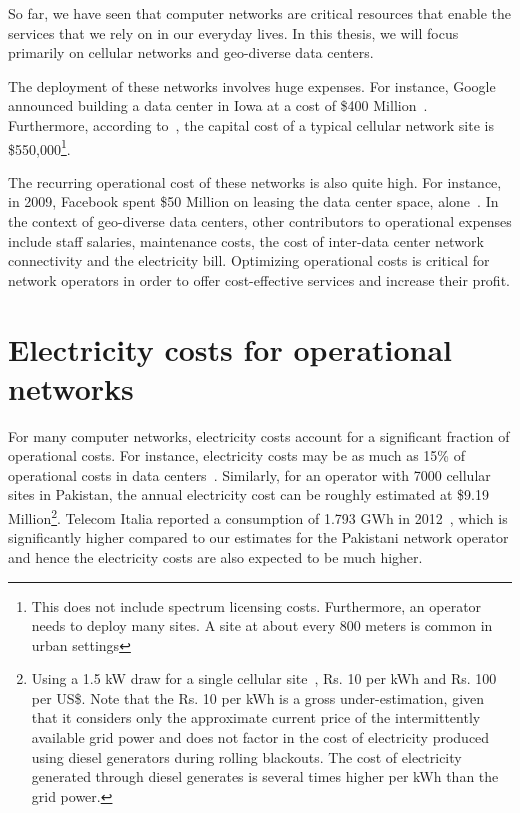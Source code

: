 So far, we have seen that computer networks are critical resources that enable the services that we rely on in our everyday lives. In this thesis, we will focus primarily on cellular networks and geo-diverse data centers. 

The deployment of these networks involves huge expenses. For instance, Google announced building a data center in Iowa at a cost of \$400 Million~\cite{CostOfADC}. Furthermore, according to~\cite{costcellsite}, the capital cost of a typical cellular network site is \$550,000\footnote{This does not include spectrum licensing costs. Furthermore, an operator needs to deploy many sites. A site at about every 800 meters is common in urban settings}. 

The recurring operational cost of these networks is also quite high. For instance, in 2009, Facebook spent \$50 Million on leasing the data center space, alone~\cite{FBLease}. In the context of geo-diverse data centers, other contributors to operational expenses include staff salaries, maintenance costs, the cost of inter-data center network connectivity and the electricity bill. Optimizing operational costs is critical for network operators in order to offer cost-effective services and increase their profit.

\section{Electricity costs for operational networks} 
For many computer networks, electricity costs account for a significant fraction of operational costs. For instance, electricity costs may be as much as 15\% of operational costs in data centers~\cite{costCloud}. Similarly, for an operator with 7000 cellular sites in Pakistan, the annual electricity cost can be roughly estimated at \$9.19 Million\footnote{Using a 1.5 kW draw for a single cellular site~\cite{mbakwe:btshybribpower:2011:necec}, Rs. 10 per kWh and Rs. 100 per US\$. Note that the Rs. 10 per kWh is a gross under-estimation, given that it considers only the approximate current price of the intermittently available grid power and does not factor in the cost of electricity produced using diesel generators during rolling blackouts. The cost of electricity generated through diesel generates is several times higher per kWh than the grid power.}. Telecom Italia reported a consumption of 1.793 GWh in 2012~\cite{TIAnnualReport}, which is significantly higher compared to our estimates for the Pakistani network operator and hence the electricity costs are also expected to be much higher. 

